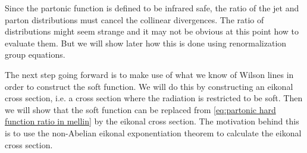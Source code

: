 Since the partonic function is defined to be infrared safe, the ratio of the jet and parton distributions must cancel the collinear divergences. The ratio of distributions might seem strange and it may not be obvious at this point how to evaluate them. But we will show later how this is done using renormalization group equations. 

The next step going forward is to make use of what we know of Wilson lines in order to construct the soft function. We will do this by constructing an eikonal cross section, i.e. a cross section where the radiation is restricted to be soft. Then we will show that the soft function can be replaced from \cref{eq:partonic hard function ratio in mellin} by the eikonal cross section. The motivation behind this is to use the non-Abelian eikonal exponentiation theorem to calculate the eikonal cross section.  



































